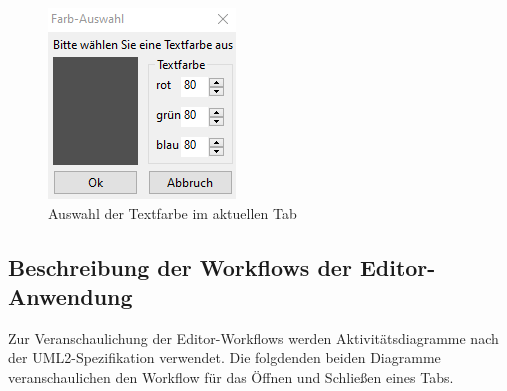 \begin{figure}[H]
    \centering
    \includegraphics[width=0.35\linewidth]{figures/app/colordialog.png}
    \caption{Auswahl der Textfarbe im aktuellen Tab}
    \label{fig:color}
\end{figure}

\subsection{Beschreibung der Workflows der Editor-Anwendung}
Zur Veranschaulichung der Editor-Workflows werden Aktivitätsdiagramme
nach der UML2-Spezifikation verwendet. Die folgdenden beiden Diagramme
veranschaulichen den Workflow für das Öffnen und Schließen eines Tabs.

